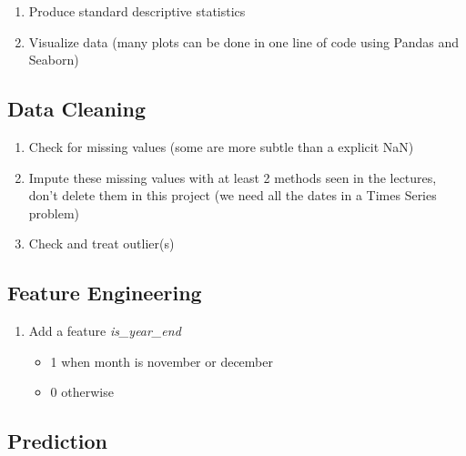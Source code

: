 \begin{enumerate}
    \item Produce standard descriptive statistics
    \item Visualize data (many plots can be done in one line of code using Pandas and Seaborn)
\end{enumerate}

\subsection{Data Cleaning}

\begin{enumerate}
    \item Check for missing values (some are more subtle than a explicit NaN)
    \item Impute these missing values with at least 2 methods seen in the lectures, 
    don't delete them in this project (we need all the dates in a Times Series problem)
    \item Check and treat outlier(s)
\end{enumerate}

\subsection{Feature Engineering}

\begin{enumerate}
    \item Add a feature \textit{is\_year\_end}
    \begin{itemize}
        \item 1 when month is november or december
        \item 0 otherwise
    \end{itemize}
\end{enumerate}

\subsection{Prediction}

